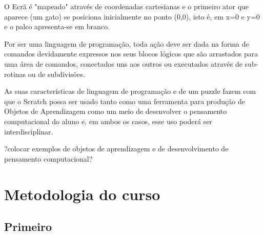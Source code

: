 \documentclass[12pt, openright, a4paper, brazil, english, french, spanish, bibjustif, openany, oneside]{abntex2}
\begin{document}
O Ecrã é "mapeado" através de coordenadas cartesianas e o primeiro ator que aparece (um gato) se posiciona inicialmente no ponto (0,0), isto é, em x=0 e y=0 e o palco apresenta-se em branco.


Por ser uma linguagem de programação, toda ação deve ser dada na forma de comandos devidamente expressos nos seus blocos lógicos que são arrastados para uma área de comandos, conectados uns aos outros ou executados através de sub-rotinas ou de subdivisões. 
 
 As suas características de linguagem de programação e de um puzzle fazem com que o Scratch possa ser usado tanto como uma ferramenta para produção de Objetos de Aprendizagem como um meio de desenvolver o pensamento computacional do aluno e, em ambos os casos, esse uso poderá ser interdisciplinar. 

?colocar exemplos de objetos de aprendizagem e de desenvolvimento de pensamento computacional?

\chapter{Metodologia do curso}



% 



\postextual





\begin{apendicesenv}
\partapendices

\chapter{Primeiro}

\end{apendicesenv}


\printindex
\end{document}
